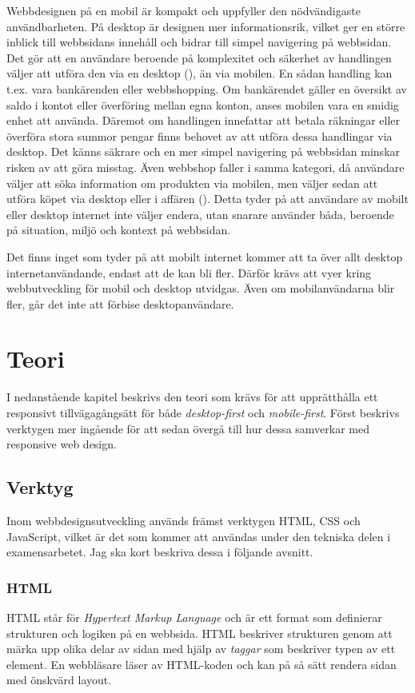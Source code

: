 \documentclass[11pt]{article}
\begin{document}
Webbdesignen på en mobil är kompakt och uppfyller den nödvändigaste användbarheten. På desktop är designen mer informationsrik, vilket ger en större inblick till webbsidans innehåll och bidrar till simpel navigering på webbsidan. Det gör att en användare beroende på komplexitet och säkerhet av handlingen väljer att utföra den via en desktop (\cite{userbeh}), än via mobilen. En sådan handling kan t.ex. vara bankärenden eller webbshopping. Om bankärendet gäller en översikt av saldo i kontot eller överföring mellan egna konton, anses mobilen vara en smidig enhet att använda. Däremot om handlingen innefattar att betala räkningar eller överföra stora summor pengar finns behovet av att utföra dessa handlingar via desktop. Det känns säkrare och en mer simpel navigering på webbsidan minskar risken av att göra misstag. Även webbshop faller i samma kategori, då användare väljer att söka information om produkten via mobilen, men väljer sedan att utföra köpet via desktop eller i affären (\cite{userbeh}). Detta tyder på att användare av mobilt eller desktop internet inte väljer endera, utan snarare använder båda, beroende på situation, miljö och kontext på webbsidan.

Det finns inget som tyder på att mobilt internet kommer att ta över allt desktop internetanvändande, endast att de kan bli fler. Därför krävs att vyer kring webbutveckling för mobil och desktop utvidgas. Även om mobilanvändarna blir fler, går det inte att förbise desktopanvändare.
\newpage

\section{Teori}
I nedanstående kapitel beskrivs den teori som krävs för att upprätthålla ett responsivt tillvägagångsätt för både \textit{desktop-first} och \textit{mobile-first}. Först beskrivs verktygen mer ingående för att sedan övergå till hur dessa samverkar med responsive web design.

\subsection{Verktyg}

Inom webbdesignsutveckling används främst verktygen HTML, CSS och JavaScript, vilket är det som kommer att användas under den tekniska delen i examensarbetet. Jag ska kort beskriva dessa i följande avsnitt.

\subsubsection{HTML}
HTML står för \textit{Hypertext Markup Language} och är ett format som definierar strukturen och logiken på en webbsida. HTML beskriver strukturen genom att märka upp olika delar av sidan med hjälp av \textit{taggar} som beskriver typen av ett element. En webbläsare läser av HTML-koden och kan på så sätt rendera sidan med önskvärd layout.
\end{document}
